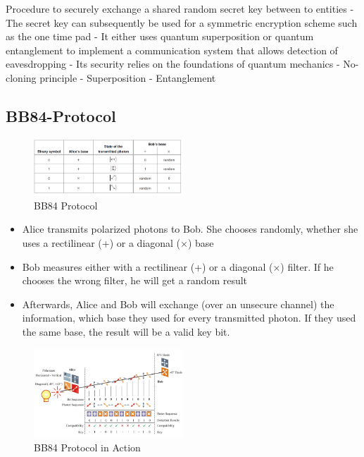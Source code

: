 Procedure to securely exchange a shared random secret key between to
entities - The secret key can subsequently be used for a symmetric
encryption scheme such as the one time pad - It either uses quantum
superposition or quantum entanglement to implement a communication
system that allows detection of eavesdropping - Its security relies on
the foundations of quantum mechanics - No-cloning principle -
Superposition - Entanglement

\hypertarget{bb84-protocol}{%
\subsection{BB84-Protocol}\label{bb84-protocol}}

\begin{figure}[H]
\centering
\includegraphics[width=0.5\textwidth]{figures/bb84-protocol.png}
\caption{BB84 Protocol}
\end{figure}

\begin{itemize}
\tightlist
\item
  Alice transmits polarized photons to Bob. She chooses randomly,
  whether she uses a rectilinear (+) or a diagonal (×) base
\item
  Bob measures either with a rectilinear (+) or a diagonal (×) filter.
  If he chooses the wrong filter, he will get a random result
\item
  Afterwards, Alice and Bob will exchange (over an unsecure channel) the
  information, which base they used for every transmitted photon. If
  they used the same base, the result will be a valid key bit.
\end{itemize}

\begin{figure}[H]
\centering
\includegraphics[width=0.5\textwidth]{figures/bb84InAction.png}
\caption{BB84 Protocol in Action}
\end{figure}

